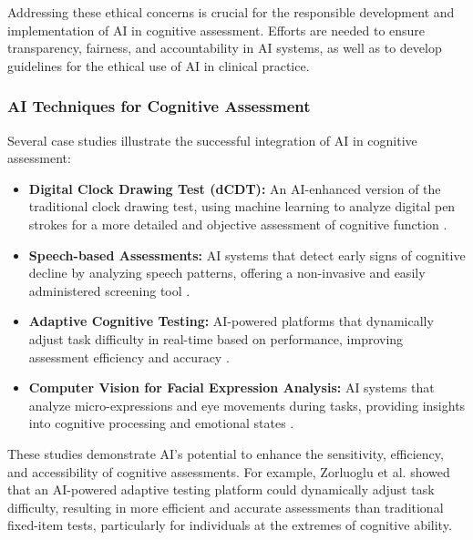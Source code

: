 Addressing these ethical concerns is crucial for the responsible development and implementation of AI in cognitive assessment. Efforts are needed to ensure transparency, fairness, and accountability in AI systems, as well as to develop guidelines for the ethical use of AI in clinical practice.

\subsubsection{AI Techniques for Cognitive Assessment}
Several case studies illustrate the successful integration of AI in cognitive assessment:
\begin{itemize}
    \item \textbf{Digital Clock Drawing Test (dCDT):} An AI-enhanced version of the traditional clock drawing test, using machine learning to analyze digital pen strokes for a more detailed and objective assessment of cognitive function \cite{Davis2017}.
    \item \textbf{Speech-based Assessments:} AI systems that detect early signs of cognitive decline by analyzing speech patterns, offering a non-invasive and easily administered screening tool \cite{Fraser2019}.
    \item \textbf{Adaptive Cognitive Testing:} AI-powered platforms that dynamically adjust task difficulty in real-time based on performance, improving assessment efficiency and accuracy \cite{Zorluoglu2020}.
    \item \textbf{Computer Vision for Facial Expression Analysis:} AI systems that analyze micro-expressions and eye movements during tasks, providing insights into cognitive processing and emotional states \cite{Bandara2018}.
\end{itemize}

These studies demonstrate AI's potential to enhance the sensitivity, efficiency, and accessibility of cognitive assessments. For example, Zorluoglu et al. \cite{Zorluoglu2020} showed that an AI-powered adaptive testing platform could dynamically adjust task difficulty, resulting in more efficient and accurate assessments than traditional fixed-item tests, particularly for individuals at the extremes of cognitive ability.

